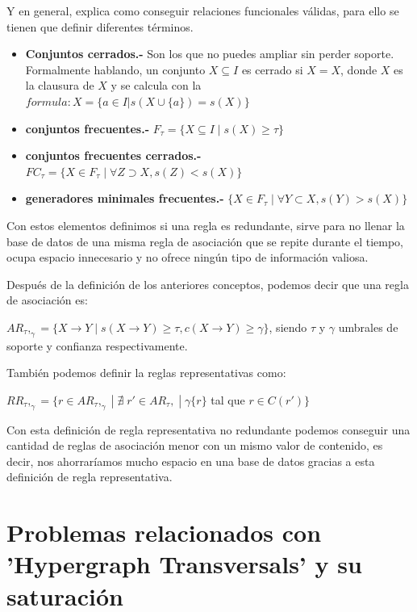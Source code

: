 \documentclass{cosas/tfg_domingo}
\begin{document}
Y en general, explica como conseguir relaciones funcionales válidas, para ello se tienen que definir diferentes términos.

\begin{itemize}
    \item \textbf{Conjuntos cerrados.-} Son los que no puedes ampliar sin perder soporte. Formalmente hablando, un conjunto $X \subseteq I$ es cerrado si $X=X$, donde $X$ es la clausura de $X$ y se calcula con la $formula :X=\{a \in I |s( X \cup\{a\}) = s(X)\}$
    
    \item \textbf{conjuntos frecuentes.-} $F_\tau=\{X \subseteq I \;|\; s(X) \geq \tau\}$
    \item \textbf{conjuntos frecuentes cerrados.-} $FC_\tau=\{X \in F_\tau \;|\; \forall Z \supset X,s(Z)<s(X)\}$
    \item \textbf{generadores minimales frecuentes.-} $\{X \in F_\tau \;|\; \forall Y \subset X,s(Y)>s(X)\}$
    
\end{itemize}

Con estos elementos definimos si una regla es redundante, sirve para no llenar la base de datos de una misma regla de asociación que se repite durante el tiempo, ocupa espacio innecesario y no ofrece ningún tipo de información valiosa.

Después de la definición de los anteriores conceptos, podemos decir  que una regla de asociación es:

$AR_\tau,_\gamma=\{X\rightarrow Y \;|\; s(X \rightarrow Y)\geq \tau,c(X \rightarrow Y) \geq \gamma\}$, siendo $\tau$ y $\gamma$ umbrales de soporte y confianza respectivamente.

También podemos definir la reglas representativas como:

$RR_\tau,_\gamma=\{r \in AR_\tau,_\gamma \;|\; \nexists \; r′ \in AR_\tau, \;|\; \gamma\{r\}$ tal que $r \in C(r′)\}$ \citep{UC}

Con esta definición de regla representativa no redundante podemos conseguir una cantidad de reglas de asociación menor con un mismo valor de contenido, es decir, nos ahorraríamos mucho espacio en una base de datos gracias a esta definición de regla representativa.


\section{Problemas relacionados con 'Hypergraph Transversals' y su saturación}
\end{document}
